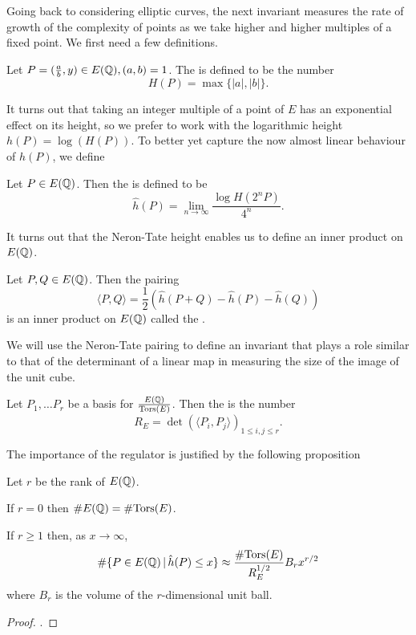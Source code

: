 \documentclass[12pt, a4paper]{report}
\begin{document}
Going back to considering elliptic curves, the next invariant measures the
rate of growth of the complexity of points as we take higher and higher
multiples of a fixed point. We first need a few definitions.

\begin{defn}
  Let $P = (\frac{a}{b},y) \in E({\mathbb Q}), (a,b) = 1$. The  is
  defined to be the number
  \[ H(P) = \max \{|a|, |b| \}.\]
\end{defn}

It turns out that taking an integer multiple of a point of $E$ has an
exponential effect on its height, so we prefer to work with the logarithmic
height $h(P) = \log (H(P))$. To better yet capture the now almost linear
behaviour of $h(P)$, we define

\begin{defn}
  Let $P \in E({\mathbb Q})$. Then the  is defined to be
  \[ \hat{h}(P) = \lim\limits_{n \rightarrow \infty} \frac{\log H(2^n P)}{4^n}. \]
\end{defn}

It turns out that the Neron-Tate height enables us to define an inner product
on $E({\mathbb Q})$.

\begin{defn}
  Let $P, Q \in E({\mathbb Q})$. Then the pairing
  \[ \langle P,Q \rangle =
    \frac{1}{2} \left( \hat{h}(P+Q) - \hat{h}(P) - \hat{h}(Q) \right)\]
  is an inner product on $E({\mathbb Q})$ called the .
\end{defn}

We will use the Neron-Tate pairing to define an invariant that plays a role
similar to that of the determinant of a linear map in measuring the size of
the image of the unit cube.

\begin{defn}[Regulator]
  Let $P_1, \dots P_r$ be a basis for $\frac{{E({\mathbb Q})}}{{\text{\normalfont Tors}} (E)}$.
  Then the  is the number
  \[R_E = \det ( \langle P_i, P_j \rangle)_{1\leq i, j \leq r}.\]
\end{defn}

The importance of the regulator is justified by the following proposition

\begin{prop}
  Let $r$ be the rank of $E({\mathbb Q})$.

  If $r = 0$ then $\# E({\mathbb Q}) = \# {\text{\normalfont Tors}}(E)$.

  If $r \geq 1$ then, as $x \rightarrow \infty$,
  \[\# \{P \in E({\mathbb Q}) \, | \, \hat{h}(P) \leq x \} \approx \frac{\#
      {\text{\normalfont Tors}}(E)}{R_E^{1/2}}
    B_r x^{r/2}\]
  where $B_r$ is the volume of the $r$-dimensional unit ball.
\end{prop}
\begin{proof}
  \cite[See][Chapter 13.7, page 127]{Granville}.
\end{proof}
  
\end{document}
